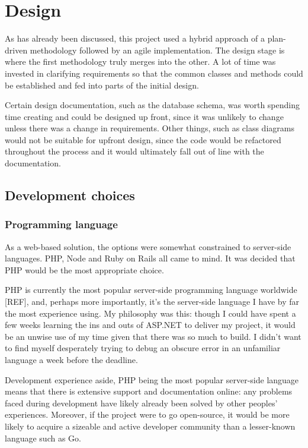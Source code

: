 \chapter{Design} %

As has already been discussed, this project used a hybrid approach of a plan-driven methodology followed by an agile implementation. The design stage is where the first methodology truly merges into the other. A lot of time was invested in clarifying requirements so that the common classes and methods could be established and fed into parts of the initial design.

Certain design documentation, such as the database schema, was worth spending time creating and could be designed up front, since it was unlikely to change unless there was a change in requirements. Other things, such as class diagrams would not be suitable for upfront design, since the code would be refactored throughout the process and it would ultimately fall out of line with the documentation.

\section{Development choices}

\subsection{Programming language}

As a web-based solution, the options were somewhat constrained to server-side languages. PHP, Node and Ruby on Rails all came to mind. It was decided that PHP would be the most appropriate choice.

PHP is currently the most popular server-side programming language worldwide [REF], and, perhaps more importantly, it's the server-side language I have by far the most experience using. My philosophy was this: though I could have spent a few weeks learning the ins and outs of ASP.NET to deliver my project, it would be an unwise use of my time given that there was so much to build. I didn't want to find myself desperately trying to debug an obscure error in an unfamiliar language a week before the deadline. %

Development experience aside, PHP being the most popular server-side language means that there is extensive support and documentation online: any problems faced during development have likely already been solved by other peoples' experiences. Moreover, if the project were to go open-source, it would be more likely to acquire a sizeable and active developer community than a lesser-known language such as Go.

